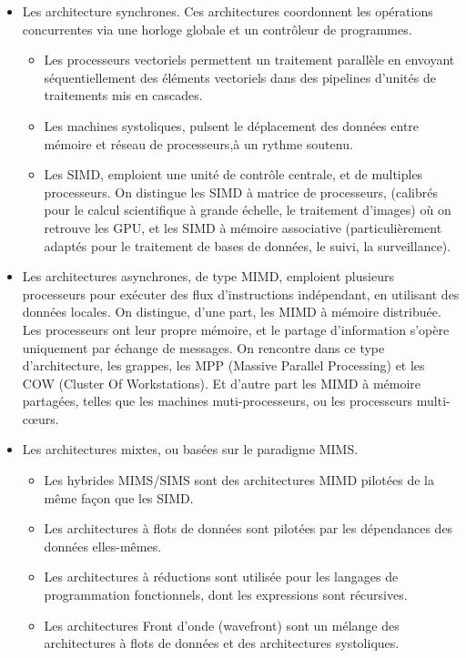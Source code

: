 \documentclass[a4paper,12pt]{report}
\theoremstyle{plain}				%
\theoremstyle{definition}				%
\begin{document}
\begin{itemize}
\item Les architecture synchrones.
  Ces architectures coordonnent les opérations concurrentes via une
  horloge globale et un contrôleur de programmes.
  \begin{itemize}
  \item Les processeurs
  vectoriels permettent un traitement parallèle en envoyant
  séquentiellement des éléments vectoriels dans des pipelines d'unités
  de traitements mis en cascades.
  \item Les machines systoliques,
  pulsent le déplacement des données entre mémoire et réseau de
  processeurs,à un rythme soutenu.
  \item Les SIMD, emploient une unité de contrôle centrale, et de
  multiples processeurs.
  On distingue les SIMD à matrice de processeurs, (calibrés pour le
  calcul scientifique à grande échelle, le traitement d'images) où on
  retrouve les GPU, et les SIMD à mémoire associative
  (particulièrement adaptés pour le traitement de bases de données, le
  suivi, la surveillance).
  \end{itemize}
\item Les architectures asynchrones, de type MIMD, emploient plusieurs
  processeurs pour exécuter des flux d'instructions indépendant, en
  utilisant des données locales.
  On distingue, d'une part, les MIMD à mémoire distribuée.
  Les processeurs ont leur propre mémoire, et le partage d'information
  s'opère uniquement par échange de messages.
  On rencontre dans ce type d'architecture, les grappes, les MPP
  (Massive Parallel Processing) et les COW (Cluster Of Workstations).
  Et d'autre part les MIMD à mémoire partagées, telles que les
  machines muti-processeurs, ou les processeurs multi-c\oe{}urs.
\item Les architectures mixtes, ou basées sur le paradigme MIMS.
  \begin{itemize}
  \item Les hybrides MIMS/SIMS sont des architectures MIMD pilotées de
  la même façon que les SIMD.
  \item Les architectures à flots de données sont pilotées par les
  dépendances des données elles-mêmes.
  \item Les architectures à réductions sont utilisée pour les langages
  de programmation fonctionnels, dont les expressions sont récursives.
  \item Les architectures Front d'onde (wavefront) sont un mélange des
  architectures à flots de données et des architectures systoliques.
  \end{itemize}

\end{itemize}
\end{document}
